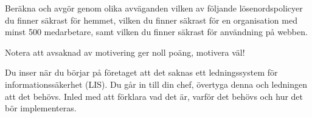 \documentclass[a4paper,11pt,addpoints]{miunexam}
\begin{document}
\begin{questions}


	\question[32]\label{xrc:Passwords}
		Beräkna och avgör genom olika avväganden vilken av följande 
		lösenordspolicyer du finner säkrast för hemmet,
		vilken du finner säkrast för en organisation med minst 500 medarbetare,
		samt vilken du finner säkrast för användning på webben.
		Notera att avsaknad av motivering ger noll poäng, motivera väl!

	\question[16]\label{xrc:PDCA}
    Du inser när du börjar på företaget att det saknas ett ledningssystem för
    informationssäkerhet (LIS). Du går in till din chef, övertyga denna och
    ledningen att det behövs. Inled med att förklara vad det är, varför det
    behövs och hur det bör implementeras.

\end{questions}


\end{document}
